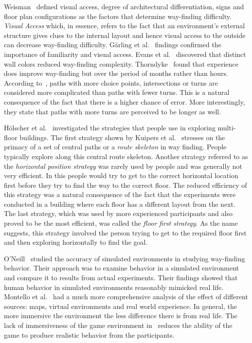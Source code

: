 Weisman~\cite{Weisman01031981} defined visual access, degree of architectural differentiation, signs and floor plan configurations as the factors that determine way-finding difficulty. \emph{Visual Access} which, in essence, refers to the fact that an environment's external structure gives clues to the internal layout and hence visual access to the outside can decrease way-finding difficulty. G{\"a}rling et al.~\cite{garling1983orientation} findings confirmed the importance of familiarity and visual access. Evans et al.~\cite{evans1980cognitive} discovered that distinct wall colors reduced way-finding complexity. Thorndyke~\cite{Thorndyke1980} found that experience does improve way-finding but over the period of months rather than hours. According to~\cite{Gopal1989309}, paths with more choice points, intersections or turns are considered more complicated than paths with fewer turns. This is a natural consequence of the fact that there is a higher chance of error. More interestingly, they state that paths with more turns are perceived to be longer as well.

H\"{o}lscher et al.~\cite{HolscherBMS06} investigated the strategies that people use in exploring multi-floor buildings. The first strategy shown by Kuipers et al.~\cite{Kuipers01012003} stresses on the primacy of a set of central paths or a \emph{route skeleton} in way finding. People typically explore along this central route skeleton. Another strategy referred to as the \emph{horizontal position strategy} was rarely used by people and was generally not very efficient. In this people would try to get to the correct horizontal location first before they try to find the way to the correct floor. The reduced efficiency of this strategy was a natural consequence of the fact that the experiments were conducted in a building where each floor has a different layout from the next. The last strategy, which was used by more experienced participants and also proved to be the most efficient, was called the \emph{floor first strategy}. As the name suggests, this strategy involved the person trying to get to the required floor first and then exploring horizontally to find the goal.


O'Neill~\cite{O'Neill1992319} studied the accuracy of simulated environments in studying way-finding behavior. Their approach was to examine behavior in a simulated environment and compare it to results from actual experiments. Their findings showed that human behavior in simulated environments reasonably mimicked real life. Montello et al.~\cite{Montello:2004uj} had a much more comprehensive analysis of the effect of different sources: maps, virtual environments and real world experience. In general, the more immersive the environment the less difference there is from real life. The lack of immersiveness of the game environment in~\cite{Bode2013347} reduces the ability of the game to produce realistic behavior from the participants.


